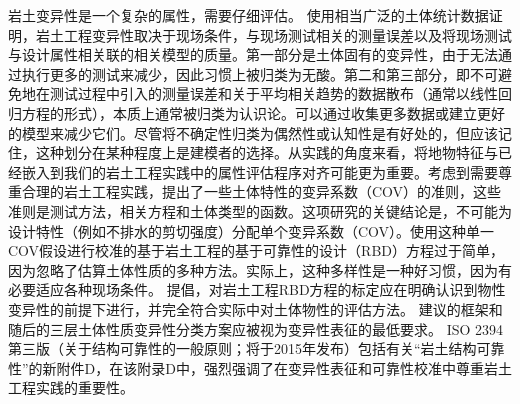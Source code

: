 \begin{Parallel}{0.60\textwidth}{}
{    }
    \ParallelRText
    {
        岩土变异性是一个复杂的属性，需要仔细评估。 \citet{Phoon1999612}使用相当广泛的土体统计数据证明，岩土工程变异性取决于现场条件，与现场测试相关的测量误差以及将现场测试与设计属性相关联的相关模型的质量。第一部分是土体固有的变异性，由于无法通过执行更多的测试来减少，因此习惯上被归类为无酸。第二和第三部分，即不可避免地在测试过程中引入的测量误差和关于平均相关趋势的数据散布（通常以线性回归方程的形式），本质上通常被归类为认识论。可以通过收集更多数据或建立更好的模型来减少它们。尽管将不确定性归类为偶然性或认知性是有好处的，但应该记住，这种划分在某种程度上是建模者的选择\citep{DerKiureghian2007}。从实践的角度来看，将地物特征与已经嵌入到我们的岩土工程实践中的属性评估程序对齐可能更为重要。考虑到需要尊重合理的岩土工程实践，\citet{Phoon1999625}提出了一些土体特性的变异系数（COV）的准则，这些准则是测试方法，相关方程和土体类型的函数。这项研究的关键结论是，不可能为设计特性（例如不排水的剪切强度）分配单个变异系数（COV）。使用这种单一COV假设进行校准的基于岩土工程的基于可靠性的设计（RBD）方程过于简单，因为忽略了估算土体性质的多种方法。实际上，这种多样性是一种好习惯，因为有必要适应各种现场条件。 \citet{Phoon1999612,Phoon1999625}提倡，对岩土工程RBD方程的标定应在明确认识到物性变异性的前提下进行，并完全符合实际中对土体物性的评估方法。 \citet{Phoon1999612,Phoon1999625}建议的框架和随后的三层土体性质变异性分类方案\citep{Phoon2008344}应被视为变异性表征的最低要求。 ISO 2394第三版（关于结构可靠性的一般原则；将于2015年发布）包括有关“岩土结构可靠性”的新附件D，在该附录D中，强烈强调了在变异性表征和可靠性校准中尊重岩土工程实践的重要性。
    }
    \ParallelPar
    \ParallelLText
    {
}
\end{Parallel}
